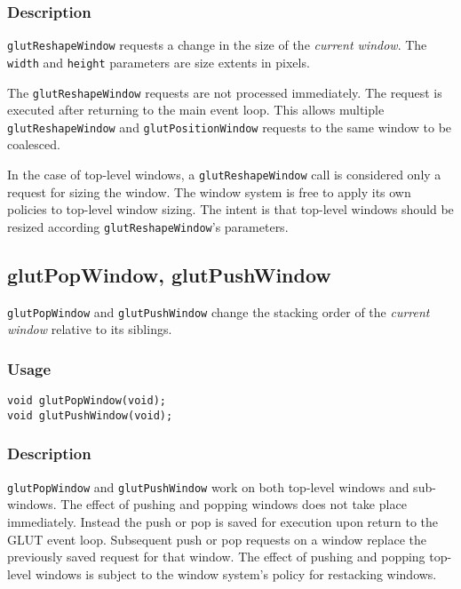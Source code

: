 \subsubsection*{Description}

{\tt glutReshapeWindow} requests a change in the size of
the {\em current window}.
The {\tt width} and {\tt height} parameters are
size extents in pixels.

The {\tt glutReshapeWindow} requests are not processed immediately.
The request is executed after returning to the main event loop.
This allows multiple {\tt glutReshapeWindow} and {\tt glutPositionWindow}
requests to the same window to be coalesced.

In the case of top-level windows, a {\tt glutReshapeWindow} call
is considered only a request for sizing the window.
The window system is free to apply its own policies to top-level
window sizing.  The intent is that top-level windows
should be resized according {\tt glutReshapeWindow}'s parameters.

\subsection{glutPopWindow, glutPushWindow}

{\tt glutPopWindow} and {\tt glutPushWindow} change the stacking order
of the {\em current window} relative to its siblings.

\subsubsection*{Usage}
\begin{verbatim}
void glutPopWindow(void);
void glutPushWindow(void);
\end{verbatim}

\subsubsection*{Description}

{\tt glutPopWindow} and {\tt glutPushWindow} work on both top-level
windows and sub-windows.  The effect of pushing and popping windows
does not take place immediately.  Instead the push or pop is saved
for execution upon return to the GLUT event loop.  Subsequent
push or pop requests on a window replace the previously saved
request for that window.  The effect of pushing and popping
top-level windows is subject to the window system's policy for
restacking windows.

